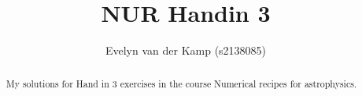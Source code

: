 \documentclass[a4paper,10pt]{article}
\title{NUR Handin 3}
\author{Evelyn van der Kamp (s2138085)}
\begin{document}
\maketitle

\begin{abstract}
 My solutions for Hand in 3 exercises in the 
 course Numerical recipes for astrophysics.
\end{abstract}


\end{document}
